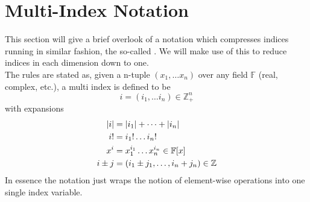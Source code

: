 \section{Multi-Index Notation\label{sec:multiIndexNotation}}
    This section will give a brief overlook of a notation which compresses
    indices running in similar fashion, the so-called \cite{multiindex}. We will make use of this to reduce indices in
    each dimension down to one. \\
    The rules are stated as, given a n-tuple $(x_1,\dots x_n)$ over any field
    $\mathbb{F}$ (real, complex, etc.), a multi index is defined to be 
        \begin{equation}
            i=(i_1,\dots i_n)\in \mathbb{Z}^n_+
        \end{equation}
    with expansions
        \begin{equation}
            \begin{aligned}
                \abs{i} &= \abs{i_1} + \dots + \abs{i_n} \\
                i! &= i_1! \dots i_n! \\
                x^i &= x^{i_1}_1 \dots x^{i_n}_n \in \mathbb{F}[x] \\
                i \pm j &= (i_1 \pm j_1,\dots, i_n+j_n) \in \mathbb{Z}
            \end{aligned}
        \end{equation}
    In essence the notation just wraps the notion of element-wise operations
    into one single index variable.
